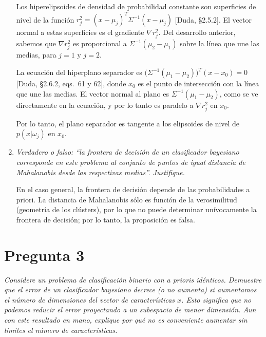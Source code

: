 \documentclass[spanish]{article}
\newcommand{\pregunta}{\textit}
\newcommand{\given}{\vert}
\begin{document}
\begin{enumerate}
        Los hiperelipsoides de densidad de probabilidad constante son superficies de nivel de la
        función $r_j^2 = (x - \mu_j)^T \Sigma^{-1} (x - \mu_j)$ [Duda, \S2.5.2].  El vector normal a
        estas superficies es el gradiente $\nabla r_j^2$.  Del desarrollo anterior, sabemos que $\nabla
        r_j^2$ es proporcional a $\Sigma^{-1}(\mu_2 - \mu_1)$ sobre la línea que une las medias,
        para $j = 1$ y $j = 2$.

        La ecuación del hiperplano separador es $\bigl(\Sigma^{-1}(\mu_1 - \mu_2)\bigr)^T(x - x_0) = 0$
        [Duda, \S2.6.2, eqs.~61 y 62],
        donde $x_0$ es el punto de intersección con la línea que une las medias.
        El vector normal al plano es $\Sigma^{-1}(\mu_1 - \mu_2)$, como se ve directamente en la
        ecuación, y por lo tanto es paralelo a $\nabla r_j^2$ en $x_0$.

        Por lo tanto, el plano separador es tangente a los elipsoides de nivel de
        $p(x\given\omega_j)$ en $x_0$.

    \item \pregunta{Verdadero o falso: ``la frontera de decisión de un clasificador bayesiano
        corresponde en este problema al conjunto de puntos de igual distancia de Mahalanobis desde
        las respectivas medias''.  Justifique.}

        En el caso general, la frontera de decisión depende de las probabilidades a priori.  La
        distancia de Mahalanobis sólo es función de la verosimilitud (geometría de los clústers),
        por lo que no puede determinar unívocamente la frontera de decisión;  por lo tanto, la
        proposición es falsa.
\end{enumerate}

\section*{Pregunta 3}
\pregunta{Considere un problema de clasificación binario con a prioris idénticos. Demuestre
    que el error de un clasificador bayesiano decrece (o no aumenta) si aumentamos el
    número de dimensiones del vector de características $x$.  Esto significa que no podemos reducir
    el error proyectando a un subespacio de menor dimensión.  Aun con este resultado en mano,
    explique por qué no es conveniente aumentar sin límites el número de características.}
\end{document}
